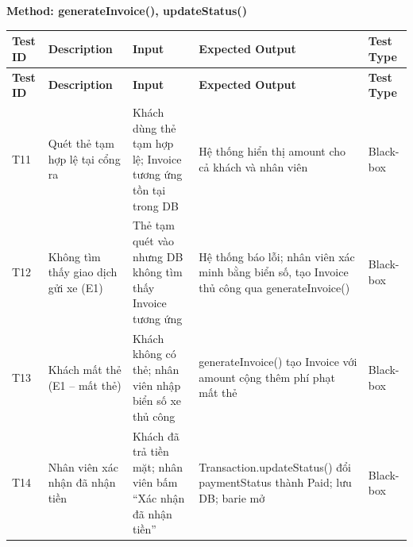 \textbf{Method: generateInvoice(), updateStatus()}

\begin{longtable}{C{1.3cm} L{3cm} L{4.5cm} L{5cm} C{2.0cm}}
\toprule
\textbf{Test ID} & \textbf{Description} & \textbf{Input} & \textbf{Expected Output} & \textbf{Test Type} \\
\midrule
\endfirsthead
\toprule
\textbf{Test ID} & \textbf{Description} & \textbf{Input} & \textbf{Expected Output} & \textbf{Test Type} \\
\midrule
\endhead
\bottomrule
\endlastfoot
 
T11 &
Quét thẻ tạm hợp lệ tại cổng ra &
Khách dùng thẻ tạm hợp lệ; Invoice tương ứng tồn tại trong DB &
Hệ thống hiển thị amount cho cả khách và nhân viên &
Black-box \\
\midrule
 
T12 &
Không tìm thấy giao dịch gửi xe (E1) &
Thẻ tạm quét vào nhưng DB không tìm thấy Invoice tương ứng &
Hệ thống báo lỗi; nhân viên xác minh bằng biển số, tạo Invoice thủ công qua generateInvoice() &
Black-box \\
\midrule
 
T13 &
Khách mất thẻ (E1 -- mất thẻ) &
Khách không có thẻ; nhân viên nhập biển số xe thủ công &
generateInvoice() tạo Invoice với amount cộng thêm phí phạt mất thẻ &
Black-box \\
\midrule
 
T14 &
Nhân viên xác nhận đã nhận tiền &
Khách đã trả tiền mặt; nhân viên bấm ``Xác nhận đã nhận tiền'' &
Transaction.updateStatus() đổi paymentStatus thành Paid; lưu DB; barie mở &
Black-box \\
\end{longtable}



